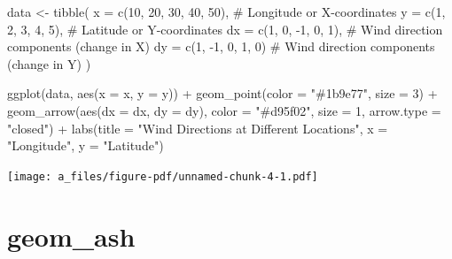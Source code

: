 \documentclass[
  letterpaper,
  DIV=11,
  numbers=noendperiod]{scrreprt}
\newenvironment{Shaded}{\begin{snugshade}}{\end{snugshade}}
\newcommand{\AttributeTok}[1]{\textcolor[rgb]{0.40,0.45,0.13}{#1}}
\newcommand{\CommentTok}[1]{\textcolor[rgb]{0.37,0.37,0.37}{#1}}
\newcommand{\DecValTok}[1]{\textcolor[rgb]{0.68,0.00,0.00}{#1}}
\newcommand{\FunctionTok}[1]{\textcolor[rgb]{0.28,0.35,0.67}{#1}}
\newcommand{\NormalTok}[1]{\textcolor[rgb]{0.00,0.23,0.31}{#1}}
\newcommand{\OtherTok}[1]{\textcolor[rgb]{0.00,0.23,0.31}{#1}}
\newcommand{\SpecialCharTok}[1]{\textcolor[rgb]{0.37,0.37,0.37}{#1}}
\newcommand{\StringTok}[1]{\textcolor[rgb]{0.13,0.47,0.30}{#1}}
\begin{document}
\begin{Shaded}
\begin{Highlighting}[]
\NormalTok{data }\OtherTok{\textless{}{-}} \FunctionTok{tibble}\NormalTok{(}
  \AttributeTok{x =} \FunctionTok{c}\NormalTok{(}\DecValTok{10}\NormalTok{, }\DecValTok{20}\NormalTok{, }\DecValTok{30}\NormalTok{, }\DecValTok{40}\NormalTok{, }\DecValTok{50}\NormalTok{),           }\CommentTok{\# Longitude or X{-}coordinates}
  \AttributeTok{y =} \FunctionTok{c}\NormalTok{(}\DecValTok{1}\NormalTok{, }\DecValTok{2}\NormalTok{, }\DecValTok{3}\NormalTok{, }\DecValTok{4}\NormalTok{, }\DecValTok{5}\NormalTok{),           }\CommentTok{\# Latitude or Y{-}coordinates}
  \AttributeTok{dx =} \FunctionTok{c}\NormalTok{(}\DecValTok{1}\NormalTok{, }\DecValTok{0}\NormalTok{, }\SpecialCharTok{{-}}\DecValTok{1}\NormalTok{, }\DecValTok{0}\NormalTok{, }\DecValTok{1}\NormalTok{),         }\CommentTok{\# Wind direction components (change in X)}
  \AttributeTok{dy =} \FunctionTok{c}\NormalTok{(}\DecValTok{1}\NormalTok{, }\SpecialCharTok{{-}}\DecValTok{1}\NormalTok{, }\DecValTok{0}\NormalTok{, }\DecValTok{1}\NormalTok{, }\DecValTok{0}\NormalTok{)          }\CommentTok{\# Wind direction components (change in Y)}
\NormalTok{)}

\FunctionTok{ggplot}\NormalTok{(data, }\FunctionTok{aes}\NormalTok{(}\AttributeTok{x =}\NormalTok{ x, }\AttributeTok{y =}\NormalTok{ y)) }\SpecialCharTok{+}
  \FunctionTok{geom\_point}\NormalTok{(}\AttributeTok{color =} \StringTok{"\#1b9e77"}\NormalTok{, }\AttributeTok{size =} \DecValTok{3}\NormalTok{) }\SpecialCharTok{+}  
  \FunctionTok{geom\_arrow}\NormalTok{(}\FunctionTok{aes}\NormalTok{(}\AttributeTok{dx =}\NormalTok{ dx, }\AttributeTok{dy =}\NormalTok{ dy), }\AttributeTok{color =} \StringTok{"\#d95f02"}\NormalTok{, }\AttributeTok{size =} \DecValTok{1}\NormalTok{, }\AttributeTok{arrow.type =} \StringTok{"closed"}\NormalTok{) }\SpecialCharTok{+}
  \FunctionTok{labs}\NormalTok{(}\AttributeTok{title =} \StringTok{"Wind Directions at Different Locations"}\NormalTok{, }\AttributeTok{x =} \StringTok{"Longitude"}\NormalTok{, }\AttributeTok{y =} \StringTok{"Latitude"}\NormalTok{)}
\end{Highlighting}
\end{Shaded}

\texttt{[image: a\_files/figure-pdf/unnamed-chunk-4-1.pdf]}

\section{geom\_ash}\label{ash}
\end{document}
